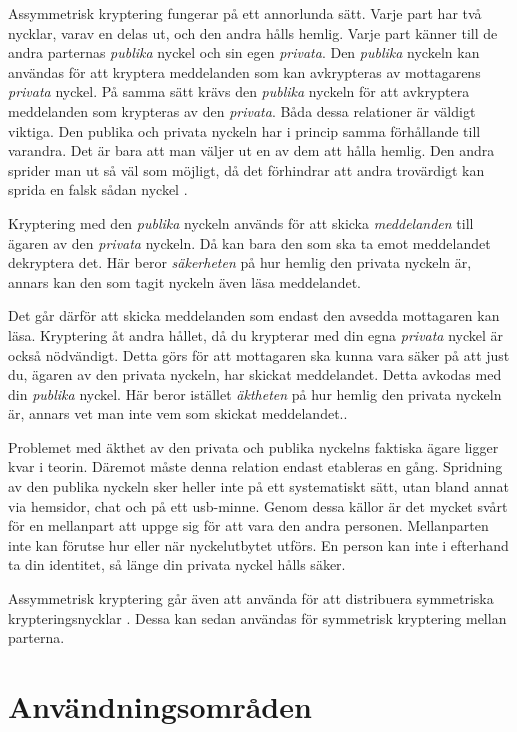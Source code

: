 \documentclass{article}
\begin{document}
	Assymmetrisk kryptering fungerar på ett annorlunda sätt. Varje part har två nycklar, varav en delas ut, och den andra hålls hemlig. Varje part känner till de andra parternas \emph{publika} nyckel och sin egen \emph{privata}.
	Den \emph{publika} nyckeln kan användas för att kryptera meddelanden som kan avkrypteras av mottagarens \emph{privata} nyckel. På samma sätt krävs den \emph{publika} nyckeln för att avkryptera meddelanden som krypteras av den \emph{privata}. Båda dessa relationer är väldigt viktiga. Den publika och privata nyckeln har i princip samma förhållande till varandra. Det är bara att man väljer ut en av dem att hålla hemlig. Den andra sprider man ut så väl som möjligt, då det förhindrar att andra trovärdigt kan sprida en falsk sådan nyckel \cite{applied-8-1}.

	Kryptering med den \emph{publika} nyckeln används för att skicka \emph{meddelanden} till ägaren av den \emph{privata} nyckeln. Då kan bara den som ska ta emot meddelandet dekryptera det. Här beror \emph{säkerheten} på hur hemlig den privata nyckeln är, annars kan den som tagit nyckeln även läsa meddelandet.

	Det går därför att skicka meddelanden som endast den avsedda mottagaren kan läsa. Kryptering åt andra hållet, då du krypterar med din egna \emph{privata} nyckel är också nödvändigt. Detta görs för att mottagaren ska kunna vara säker på att just du, ägaren av den privata nyckeln, har skickat meddelandet. Detta avkodas med din \emph{publika} nyckel. Här beror istället \emph{äktheten} på hur hemlig den privata nyckeln är, annars vet man inte vem som skickat meddelandet..

Problemet med äkthet av den privata och publika nyckelns faktiska ägare ligger kvar i teorin. Däremot måste denna relation endast etableras en gång. Spridning av den publika nyckeln sker heller inte på ett systematiskt sätt, utan bland annat via hemsidor, chat och på ett usb-minne. Genom dessa källor är det mycket svårt för en mellanpart att uppge sig för att vara den andra personen. Mellanparten inte kan förutse hur eller när nyckelutbytet utförs. En person kan inte i efterhand ta din identitet, så länge din privata nyckel hålls säker.

Assymmetrisk kryptering går även att använda för att distribuera symmetriska krypteringsnycklar \cite{applied-12-5}. Dessa kan sedan användas för symmetrisk kryptering mellan parterna.

\section {Användningsområden}
\end{document}
